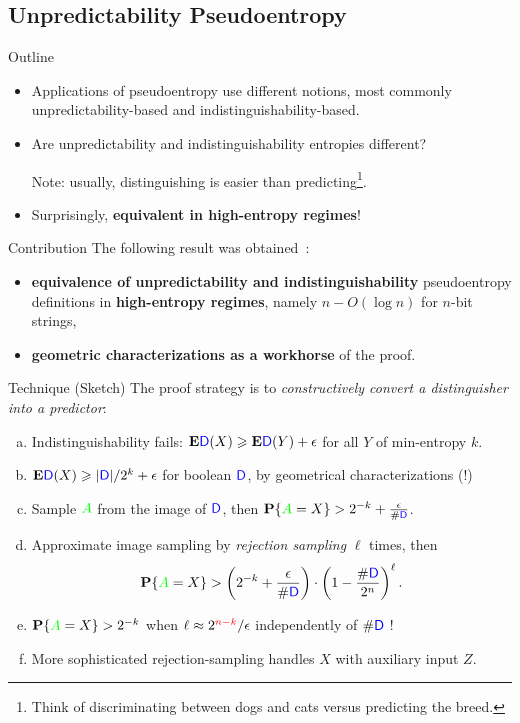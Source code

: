 \documentclass[9pt]{beamer}					%
\begin{document}
\subsection{Unpredictability Pseudoentropy }

\begin{frame}{Outline}
\begin{itemize}
\item[\emoji{open-book}] Applications of pseudoentropy use different notions, most commonly unpredictability-based and indistinguishability-based.
\item[\emoji{question}] Are unpredictability and indistinguishability entropies different? 

Note: usually, distinguishing is easier than predicting\footnote{Think of discriminating between dogs and cats versus predicting the breed.}.
\item[\emoji{raised-hand}] Surprisingly, \textbf{equivalent in high-entropy regimes}!
\end{itemize}
\end{frame}

\begin{frame}{Contribution}
The following result was obtained~\cite{DBLP:conf/icalp/SkorskiGP15}:
\begin{itemize}
    \item[\emoji{key}] \textbf{equivalence of unpredictability and indistinguishability} pseudoentropy definitions in \textbf{high-entropy regimes}, namely $n-O(\log n)$ for $n$-bit strings,
    \item[\emoji{key}] \textbf{geometric characterizations as a workhorse} of the proof.
\end{itemize}
\end{frame}

\begin{frame}{Technique (Sketch)}
The proof strategy is to \emph{constructively convert a distinguisher into a predictor}:
\newcommand{\D}{\textcolor{blue}{\mathsf{D}}}
\begin{enumerate}[(a)]
    \item Indistinguishability fails: $\mathbf{E}\D(X)\geqslant \mathbf{E}\D(Y)+\epsilon$ for all $Y$ of min-entropy $k$.
    \item $\mathbf{E}\D(X)\geqslant |\D|/2^{k}+\epsilon$ for boolean $\D$, by geometrical characterizations (!)
    \item Sample $\textcolor{green}{A}$ from the image of $\D$, then $\mathbf{P}\{\textcolor{green}{A} = X\} > 2^{-k}+\frac{\epsilon}{\#\D}$.
    \item Approximate image sampling by \emph{rejection sampling} $\ell$ times, then
    $$\mathbf{P}\{\textcolor{green}{A} = X\} > \left( 2^{-k}+\frac{\epsilon}{\#\D} \right)\cdot \left(1-\frac{\# \D}{2^n}\right)^{\ell}.$$
    \item $\mathbf{P}\{\textcolor{green}{A} = X\} > 2^{-k}$  when $\ell \approx 2^{\textcolor{red}{n-k}}/\epsilon$ independently of $\# \D$ !
    \item[\emoji{warning}] More sophisticated rejection-sampling handles $X$ with auxiliary input $Z$.
\end{enumerate}
\end{frame}
\end{document}
